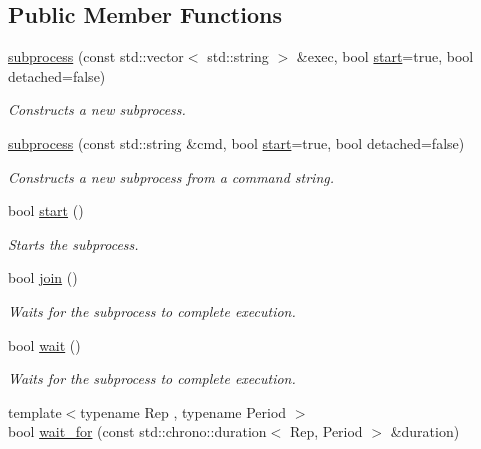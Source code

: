 \subsection*{Public Member Functions}
\begin{DoxyCompactItemize}
\item 
\hyperlink{classcpen333_1_1process_1_1windows_1_1subprocess_ab927ab6d2b499cb7079bc2dedbd670ff}{subprocess} (const std\+::vector$<$ std\+::string $>$ \&exec, bool \hyperlink{classcpen333_1_1process_1_1windows_1_1subprocess_ad6fddf2c148cefff9753dafaeb35d1a3}{start}=true, bool detached=false)
\begin{DoxyCompactList}\small\item\em Constructs a new subprocess. \end{DoxyCompactList}\item 
\hyperlink{classcpen333_1_1process_1_1windows_1_1subprocess_adf8e8c5cbeb63bebd888896a07b4fa58}{subprocess} (const std\+::string \&cmd, bool \hyperlink{classcpen333_1_1process_1_1windows_1_1subprocess_ad6fddf2c148cefff9753dafaeb35d1a3}{start}=true, bool detached=false)
\begin{DoxyCompactList}\small\item\em Constructs a new subprocess from a command string. \end{DoxyCompactList}\item 
bool \hyperlink{classcpen333_1_1process_1_1windows_1_1subprocess_ad6fddf2c148cefff9753dafaeb35d1a3}{start} ()
\begin{DoxyCompactList}\small\item\em Starts the subprocess. \end{DoxyCompactList}\item 
bool \hyperlink{classcpen333_1_1process_1_1windows_1_1subprocess_a973a466ad1f7299d1511e4a0628bc3f4}{join} ()
\begin{DoxyCompactList}\small\item\em Waits for the subprocess to complete execution. \end{DoxyCompactList}\item 
bool \hyperlink{classcpen333_1_1process_1_1windows_1_1subprocess_a54fe40167d1bf23bce4195c5aa34ec5f}{wait} ()
\begin{DoxyCompactList}\small\item\em Waits for the subprocess to complete execution. \end{DoxyCompactList}\item 
{\footnotesize template$<$typename Rep , typename Period $>$ }\\bool \hyperlink{classcpen333_1_1process_1_1windows_1_1subprocess_aed7bf88b47dfa88ba8c97d6dbc94c124}{wait\+\_\+for} (const std\+::chrono\+::duration$<$ Rep, Period $>$ \&duration)

\end{DoxyCompactItemize}
